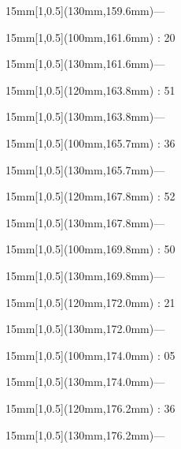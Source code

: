 \documentclass[a4paper]{memoir}
\begin{document}
\begin{textblock*}{15mm}[1,0.5](130mm,159.6mm)\flushright —\end{textblock*}
\begin{textblock*}{15mm}[1,0.5](100mm,161.6mm) : 20\end{textblock*}
\begin{textblock*}{15mm}[1,0.5](130mm,161.6mm)\flushright —\end{textblock*}
\begin{textblock*}{15mm}[1,0.5](120mm,163.8mm) : 51\end{textblock*}
\begin{textblock*}{15mm}[1,0.5](130mm,163.8mm)\flushright —\end{textblock*}
\begin{textblock*}{15mm}[1,0.5](100mm,165.7mm) : 36\end{textblock*}
\begin{textblock*}{15mm}[1,0.5](130mm,165.7mm)\flushright —\end{textblock*}
\begin{textblock*}{15mm}[1,0.5](120mm,167.8mm) : 52\end{textblock*}
\begin{textblock*}{15mm}[1,0.5](130mm,167.8mm)\flushright —\end{textblock*}
\begin{textblock*}{15mm}[1,0.5](100mm,169.8mm) : 50\end{textblock*}
\begin{textblock*}{15mm}[1,0.5](130mm,169.8mm)\flushright —\end{textblock*}
\begin{textblock*}{15mm}[1,0.5](120mm,172.0mm) : 21\end{textblock*}
\begin{textblock*}{15mm}[1,0.5](130mm,172.0mm)\flushright —\end{textblock*}
\begin{textblock*}{15mm}[1,0.5](100mm,174.0mm) : 05\end{textblock*}
\begin{textblock*}{15mm}[1,0.5](130mm,174.0mm)\flushright —\end{textblock*}
\begin{textblock*}{15mm}[1,0.5](120mm,176.2mm) : 36\end{textblock*}
\begin{textblock*}{15mm}[1,0.5](130mm,176.2mm)\flushright —\end{textblock*}
\end{document}
